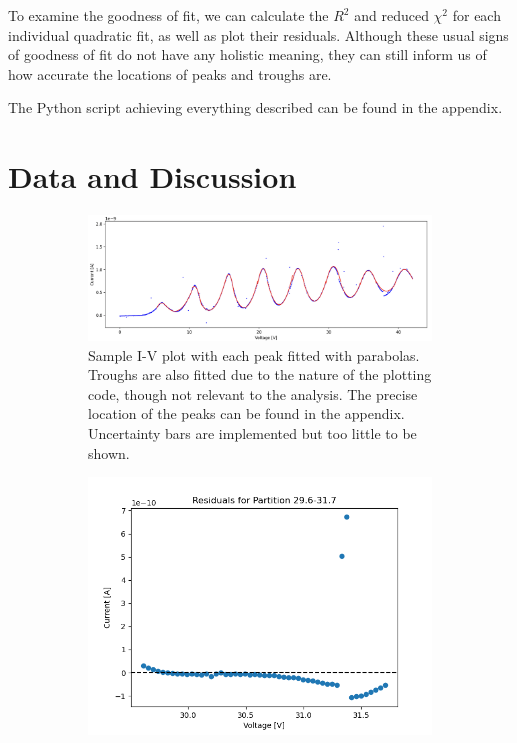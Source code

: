 \documentclass[12pt]{article}
\begin{document}
To examine the goodness of fit, we can calculate the $R^2$ and reduced $\chi^2$ for each individual quadratic fit, as well as plot their residuals. Although these usual signs of goodness of fit do not have any holistic meaning, they can still inform us of how accurate the locations of peaks and troughs are. 

The Python script achieving everything described can be found in the appendix.


\section{Data and Discussion}
\begin{figure}[h!]
    \centering
    \begin{subfigure}{1\textwidth}
    \includegraphics[width=1\textwidth]{figure/Plots/T1.png}
    \caption{\centering Sample I-V plot with each peak fitted with parabolas. Troughs are also fitted due to the nature of the plotting code, though not relevant to the analysis. The precise location of the peaks can be found in the appendix. Uncertainty bars are implemented but too little to be shown.}
        \label{fig:T4m}
    \end{subfigure}
    \begin{subfigure}{0.45\textwidth}
        \includegraphics[width=\textwidth]{figure/Plots/11.png}

\end{subfigure}
\end{figure}
\end{document}
